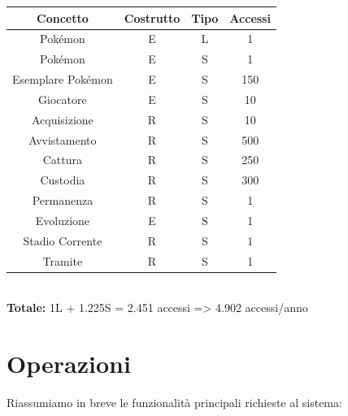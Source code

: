 \documentclass[a4paper,12pt]{report}
\begin{document}
\begin{enumerate}
  \begin{tabular}{|c|c|c|c|}
  	\hline
  	\rowcolor{gray!30}Concetto & Costrutto & Tipo & Accessi \\
  	\hline
    Pokémon & E & L & 1 \\
  	\hline
    Pokémon & E & S & 1 \\
  	\hline
    Esemplare Pokémon & E & S & 150 \\
  	\hline
    Giocatore & E & S & 10 \\
  	\hline
    Acquisizione & R & S & 10 \\
  	\hline
    Avvistamento & R & S & 500 \\
  	\hline
    Cattura & R & S & 250 \\
  	\hline
    Custodia & R & S & 300 \\
  	\hline
    Permanenza & R & S & 1 \\
  	\hline
    Evoluzione & E & S & 1 \\
  	\hline
    Stadio Corrente & R & S & 1 \\
    \hline
    Tramite & R & S & 1 \\
    \hline
  \end{tabular} \\
  
  \textbf{Totale:} 1L + 1.225S = 2.451 accessi => 4.902 accessi/anno
  
  \end{enumerate}

\section{Operazioni}

Riassumiamo in breve le funzionalità principali richieste al sistema:
\end{document}
